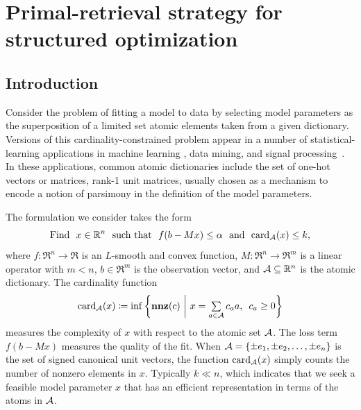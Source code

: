 \chapter{Primal-retrieval strategy for structured optimization}
\label{ch:App-Primal-Retrieval}

\section{Introduction} \label{sec:4-1}

Consider the problem of fitting a model to data by selecting model parameters as the superposition of a limited set atomic elements taken from a given dictionary. Versions of this cardinality-constrained problem appear in a number of statistical-learning applications in machine learning \cite{tibshirani1996regression,yul06,Meinshausen06,aep08}, data mining, and signal processing~\cite{candes:2013}. In these applications, common atomic dictionaries include the set of one-hot vectors or matrices, rank-1 unit matrices, usually chosen as a mechanism to encode a notion of parsimony in the definition of the model parameters.

The formulation we consider takes the form
\begin{equation} \label{eq:main_prob} 
    \mathop{\hbox{\rm Find}}\enspace x\in\mathbb{R}^n \enspace\mathop{\hbox{\rm such that}}\enspace f(b - Mx) \leq \alpha \enspace\mathop{\hbox{\rm and}}\enspace \operatorname{card}_{\mathcal{A}}(x) \leq k,
\end{equation}
where $f:\Re^n\to\Re$ is an $L$-smooth and convex function, $M: \Re^n \to \Re^m$ is a linear operator with $m < n$, $b \in \Re^m$ is the observation vector, and $\mathcal{A} \subseteq \mathbb{R}^n$ is the atomic dictionary. The cardinality function 
\begin{equation}\label{eq-card-fcn}
    \operatorname{card}_{\mathcal{A}}(x) \coloneqq \inf\left\{ \mathbf{nnz}(c) ~\bigg\vert~ x = \textstyle\sum\limits_{a \in \mathcal{A}} c_a a, \enspace c_a \geq 0\right\}
\end{equation}
measures the complexity of $x$ with respect to the atomic set $\mathcal{A}$.  The loss term $f(b - Mx)$ measures the quality of the fit. When $\mathcal{A} = \{ \pm e_1,\pm e_2, \ldots,\pm e_n \}$ is the set of signed canonical unit vectors, the function $\operatorname{card}_{\mathcal{A}}(x)$ simply counts the number of nonzero elements in $x$. Typically $k\ll n$, which indicates that we seek a feasible model parameter $x$ that has an efficient representation in terms of the atoms in $\mathcal{A}$.

